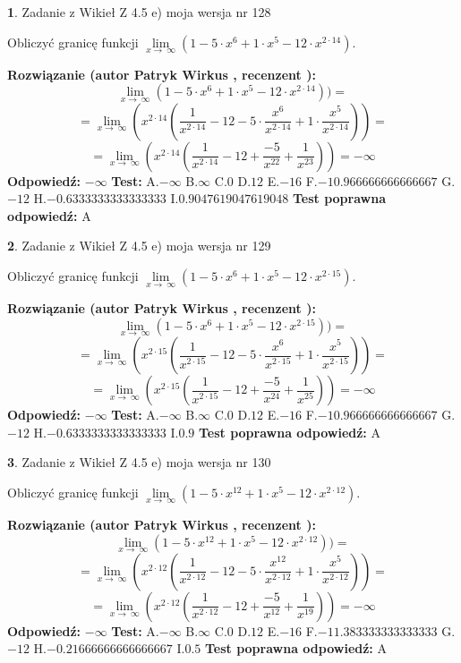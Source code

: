 \documentclass[12pt, a4paper]{article}
\theoremstyle{definition} %
\newtheorem{zad}{}
\newcommand{\zadStart}[1]{\begin{zad}#1\newline}
\newcommand{\zadStop}{\end{zad}}
\newcommand{\rozwStart}[2]{\noindent \textbf{Rozwiązanie (autor #1 , recenzent #2): }\newline}
\newcommand{\rozwStop}{\newline}
\newcommand{\odpStart}{\noindent \textbf{Odpowiedź:}\newline}
\newcommand{\odpStop}{\newline}
\newcommand{\testStart}{\noindent \textbf{Test:}\newline}
\newcommand{\testStop}{\newline}
\newcommand{\kluczStart}{\noindent \textbf{Test poprawna odpowiedź:}\newline}
\newcommand{\kluczStop}{\newline}
\begin{document}
\zadStart{Zadanie z Wikieł Z 4.5 e) moja wersja nr 128}


Obliczyć granicę funkcji  $\lim\limits_{x\to\ \infty}(1 - 5 \cdot x^{6}+1 \cdot x^{5}- 12 \cdot x^{2\cdot14})$.
\zadStop
\rozwStart{Patryk Wirkus}{}
$$\lim\limits_{x\to\ \infty}(1 - 5 \cdot x^{6}+1 \cdot x^{5}- 12 \cdot x^{2\cdot14}))=$$
$$=\lim\limits_{x\to\ \infty}(x^{2\cdot14}(\frac{1}{x^{2\cdot14}}-12 -5 \cdot \frac{x^{6}}{x^{2\cdot14}}+1 \cdot \frac{x^{5}}{x^{2\cdot14}}))=$$
$$=\lim\limits_{x\to\ \infty}(x^{2\cdot14}(\frac{1}{x^{2\cdot14}}-12 + \frac{-5}{x^{22}}+ \frac{1}{x^{23}}))=-\infty$$
\rozwStop
\odpStart
$-\infty$
\odpStop
\testStart
A.$-\infty$ B.$\infty$ C.$0$ D.$12$ E.$-16$
F.$-10.966666666666667$ G.$-12$
H.$-0.6333333333333333$
I.$0.9047619047619048$
\testStop
\kluczStart
A
\kluczStop



\zadStart{Zadanie z Wikieł Z 4.5 e) moja wersja nr 129}


Obliczyć granicę funkcji  $\lim\limits_{x\to\ \infty}(1 - 5 \cdot x^{6}+1 \cdot x^{5}- 12 \cdot x^{2\cdot15})$.
\zadStop
\rozwStart{Patryk Wirkus}{}
$$\lim\limits_{x\to\ \infty}(1 - 5 \cdot x^{6}+1 \cdot x^{5}- 12 \cdot x^{2\cdot15}))=$$
$$=\lim\limits_{x\to\ \infty}(x^{2\cdot15}(\frac{1}{x^{2\cdot15}}-12 -5 \cdot \frac{x^{6}}{x^{2\cdot15}}+1 \cdot \frac{x^{5}}{x^{2\cdot15}}))=$$
$$=\lim\limits_{x\to\ \infty}(x^{2\cdot15}(\frac{1}{x^{2\cdot15}}-12 + \frac{-5}{x^{24}}+ \frac{1}{x^{25}}))=-\infty$$
\rozwStop
\odpStart
$-\infty$
\odpStop
\testStart
A.$-\infty$ B.$\infty$ C.$0$ D.$12$ E.$-16$
F.$-10.966666666666667$ G.$-12$
H.$-0.6333333333333333$
I.$0.9$
\testStop
\kluczStart
A
\kluczStop



\zadStart{Zadanie z Wikieł Z 4.5 e) moja wersja nr 130}


Obliczyć granicę funkcji  $\lim\limits_{x\to\ \infty}(1 - 5 \cdot x^{12}+1 \cdot x^{5}- 12 \cdot x^{2\cdot12})$.
\zadStop
\rozwStart{Patryk Wirkus}{}
$$\lim\limits_{x\to\ \infty}(1 - 5 \cdot x^{12}+1 \cdot x^{5}- 12 \cdot x^{2\cdot12}))=$$
$$=\lim\limits_{x\to\ \infty}(x^{2\cdot12}(\frac{1}{x^{2\cdot12}}-12 -5 \cdot \frac{x^{12}}{x^{2\cdot12}}+1 \cdot \frac{x^{5}}{x^{2\cdot12}}))=$$
$$=\lim\limits_{x\to\ \infty}(x^{2\cdot12}(\frac{1}{x^{2\cdot12}}-12 + \frac{-5}{x^{12}}+ \frac{1}{x^{19}}))=-\infty$$
\rozwStop
\odpStart
$-\infty$
\odpStop
\testStart
A.$-\infty$ B.$\infty$ C.$0$ D.$12$ E.$-16$
F.$-11.383333333333333$ G.$-12$
H.$-0.21666666666666667$
I.$0.5$
\testStop
\kluczStart
A
\kluczStop
\end{document}
